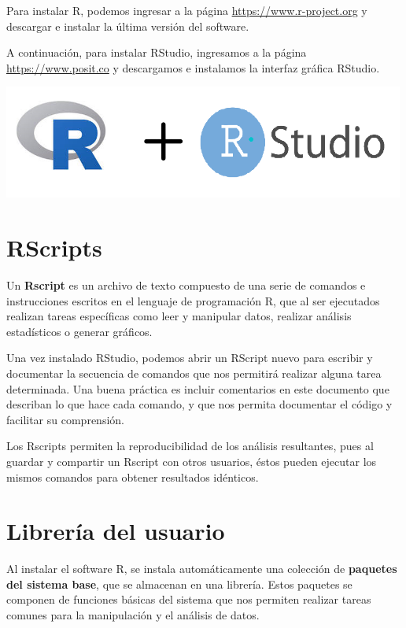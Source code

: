 \documentclass[
]{book}
\begin{document}
Para instalar R, podemos ingresar a la página \url{https://www.r-project.org} y descargar e instalar la última versión del software.

A continuación, para instalar RStudio, ingresamos a la página \url{https://www.posit.co} y descargamos e instalamos la interfaz gráfica RStudio.

\includegraphics[width=5.20833in,height=\textheight]{RyRStudio.png}

\hypertarget{rscripts}{%
\section{RScripts}\label{rscripts}}

Un \textbf{Rscript} es un archivo de texto compuesto de una serie de comandos e instrucciones escritos en el lenguaje de programación R, que al ser ejecutados realizan tareas específicas como leer y manipular datos, realizar análisis estadísticos o generar gráficos.

Una vez instalado RStudio, podemos abrir un RScript nuevo para escribir y documentar la secuencia de comandos que nos permitirá realizar alguna tarea determinada. Una buena práctica es incluir comentarios en este documento que describan lo que hace cada comando, y que nos permita documentar el código y facilitar su comprensión.

Los Rscripts permiten la reproducibilidad de los análisis resultantes, pues al guardar y compartir un Rscript con otros usuarios, éstos pueden ejecutar los mismos comandos para obtener resultados idénticos.

\hypertarget{libreruxeda-del-usuario}{%
\section{Librería del usuario}\label{libreruxeda-del-usuario}}

Al instalar el software R, se instala automáticamente una colección de \textbf{paquetes del sistema base}, que se almacenan en una librería. Estos paquetes se componen de funciones básicas del sistema que nos permiten realizar tareas comunes para la manipulación y el análisis de datos.
\end{document}
